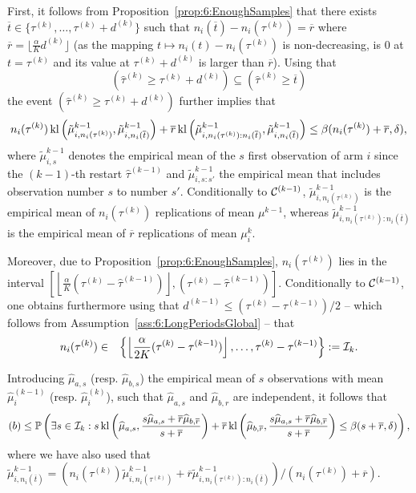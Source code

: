 First, it follows from Proposition~\ref{prop:6:EnoughSamples} that there exists $\overline{t} \in \{\tau^{(k)}, \dots, \tau^{(k)} + d^{(k)} \}$ such that
$n_i(\overline{t}) - n_i(\tau^{(k)}) = \overline{r}$ where $\overline{r} = \lfloor \frac{\alpha}{K} d^{(k)}\rfloor$
(as the mapping $t\mapsto n_i(t) - n_i(\tau^{(k)})$ is non-decreasing, is $0$ at $t=\tau^{(k)}$ and its value at $\tau^{(k)}+d^{(k)}$ is larger than $\overline{r}$).
Using that \[\left(\widehat{\tau}^{(k)} \geq \tau^{(k)} + d^{(k)}\right) \subseteq \left(\widehat{\tau}^{(k)} \geq \overline{t}\right)\]
the event $\left(\widehat{\tau}^{(k)} \geq \tau^{(k)} + d^{(k)}\right)$ further implies that
\[
    n_i(\tau^{(k)}) \, \mathrm{kl}\left(\tilde{\mu}^{k-1}_{i,n_i(\tau^{(k)})},\tilde{\mu}^{k-1}_{i,n_i(\overline{t})}\right)
    + \overline{r} \, \mathrm{kl}\left(\tilde{\mu}^{k-1}_{i,n_i(\tau^{(k)}) : n_i(\overline{t})},\tilde{\mu}^{k-1}_{i,n_i(\overline{t})}\right) \leq \beta(n_i(\tau^{(k)}) + \overline{r},\delta),
\]
where $\tilde{\mu}^{k-1}_{i,s}$ denotes the empirical mean of the $s$ first observation of arm $i$ since the $(k-1)$-th restart $\hat{\tau}^{(k-1)}$ and  $\tilde{\mu}^{k-1}_{i,s:s'}$ the empirical mean that includes observation number $s$ to number $s'$. Conditionally to $\mathcal{C}^{(k-1)}$, $\tilde{\mu}^{k-1}_{i,n_i(\tau^{(k)})}$ is the empirical mean of $n_i(\tau^{(k)})$ \iid{} replications of mean $\mu^{k-1}$, whereas $\tilde{\mu}^{k-1}_{i,n_i(\tau^{(k)}) : n_i(\overline{t})}$ is the empirical mean of $\overline{r}$ \iid{} replications of mean $\mu_i^{k}$.

Moreover, due to Proposition~\ref{prop:6:EnoughSamples}, $n_i(\tau^{(k)})$ lies in the interval $
\left[\left\lfloor \frac{\alpha}{K}\left(\tau^{(k)}-\widehat{\tau}^{(k-1)}\right)\right\rfloor,\left(\tau^{(k)}-\widehat{\tau}^{(k-1)}\right)\right]$. Conditionally to $\mathcal{C}^{(k-1)}$, one obtains furthermore using that $d^{(k-1)} \leq (\tau^{(k)} - \tau^{(k-1)})/2$ -- which follows from Assumption~\ref{ass:6:LongPeriodsGlobal} -- that
%
\begin{eqnarray*}
    n_i(\tau^{(k)})& \in& \left\{ \left\lfloor \frac{\alpha}{2K} (\tau^{(k)}-\tau^{(k-1)} )\right\rfloor, \dots, \tau^{(k)}-\tau^{(k-1)} \right\} := \mathcal{I}_k.
\end{eqnarray*}

Introducing $\widehat{\mu}_{a,s}$ (resp. $\widehat{\mu}_{b,s}$) the empirical mean of $s$ \iid{} observations with mean $\widehat{\mu}_i^{(k-1)}$ (resp. $\widehat{\mu}_i^{(k)}$), such that $\widehat{\mu}_{a,s}$ and $\widehat{\mu}_{b,r}$ are independent, it follows that
\[
    (b)  \leq \mathbb{P}\left(\exists s \in \mathcal{I}_k : s \, \mathrm{kl}\left(\widehat{\mu}_{a,s},\frac{s\widehat{\mu}_{a,s}+\overline{r}\widehat{\mu}_{b,\overline{r}}}{s+\overline{r}} \right) +  \overline{r} \, \mathrm{kl}\left(\widehat{\mu}_{b,\overline{r}},\frac{s\widehat{\mu}_{a,s}+\overline{r}\widehat{\mu}_{b,\overline{r}}}{s+\overline{r}}  \right)  \leq \beta(s+\overline{r},\delta)\right),
\]
where we have also used that $\tilde{\mu}^{k-1}_{i,n_i(\overline{t})} = \left(n_i(\tau^{(k)})\tilde{\mu}^{k-1}_{i,n_i(\tau^{(k)})} + \overline{r}\tilde{\mu}^{k-1}_{i,n_i(\tau^{(k)}) : n_i(\overline{t})} \right) / (n_i(\tau^{(k)}) + \overline{r})$.

